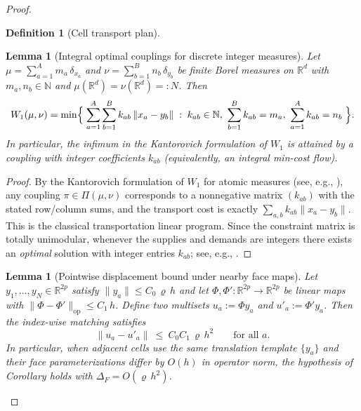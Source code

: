 \documentclass[11pt]{article}
\numberwithin{equation}{section}  %
\theoremstyle{plain}
\newtheorem{lemma}[theorem]{Lemma}
\theoremstyle{definition}
\newtheorem{definition}[theorem]{Definition}
\theoremstyle{remark}
\newcommand{\R}{\mathbb{R}}
\begin{document}
\begin{proof}
\begin{definition}[Cell transport plan]
\end{definition}

\begin{lemma}[Integral optimal couplings for discrete integer measures]\label{lem:w1-integral-optimal}\label{lem:transport-exists}
Let $\mu=\sum_{a=1}^A m_a\,\delta_{x_a}$ and $\nu=\sum_{b=1}^B n_b\,\delta_{y_b}$ be finite Borel measures on $\R^d$
with $m_a,n_b\in\mathbb{N}$ and $\mu(\R^d)=\nu(\R^d)=:N$.
Then
\[
W_1(\mu,\nu)
=\min\Bigl\{\;\sum_{a=1}^A\sum_{b=1}^B k_{ab}\,\|x_a-y_b\|\;:\;
k_{ab}\in\mathbb{N},\ \sum_{b=1}^B k_{ab}=m_a,\ \sum_{a=1}^A k_{ab}=n_b\;\Bigr\}.
\]
In particular, the infimum in the Kantorovich formulation of $W_1$ is attained by a coupling with \emph{integer} coefficients
$k_{ab}$ (equivalently, an integral min-cost flow).
\end{lemma}


\begin{proof}
\noindent\textbf{}
By the Kantorovich formulation of $W_1$ for atomic measures (see, e.g., \cite{Villani03}),
any coupling $\pi\in\Pi(\mu,\nu)$ corresponds to a nonnegative matrix $(k_{ab})$ with the stated row/column sums, and the
transport cost is exactly $\sum_{a,b} k_{ab}\|x_a-y_b\|$.
This is the classical transportation linear program.  Since the constraint matrix is totally unimodular, whenever the supplies
and demands are integers there exists an \emph{optimal} solution with integer entries $k_{ab}$; see, e.g., \cite{Schrijver86}.
\end{proof}





\begin{lemma}[Pointwise displacement bound under nearby face maps]\label{lem:face-displacement}
Let $y_1,\dots,y_N\in\R^{2p}$ satisfy $\|y_a\|\le C_0\,\varrho\,h$ and let $\Phi,\Phi':\R^{2p}\to\R^{2p}$ be linear maps with
$\|\Phi-\Phi'\|_{\mathrm{op}}\le C_1\,h$.
Define two multisets $u_a:=\Phi y_a$ and $u'_a:=\Phi' y_a$.
Then the index-wise matching satisfies
\[
\|u_a-u'_a\|\ \le\ C_0C_1\,\varrho\,h^2\qquad\text{for all }a.
\]
In particular, when adjacent cells use the \emph{same} translation template $\{y_a\}$ and their face parameterizations differ by $O(h)$ in operator norm,
the hypothesis of Corollary holds with $\Delta_F=O(\varrho\,h^2)$.
\end{lemma}


\end{proof}
\end{document}
